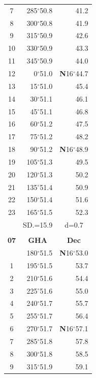 \documentclass[10pt, a4paper]{report}
\begin{document}
\begin{scriptsize}
\begin{tabular*}{0.2\textwidth}[t]{@{\extracolsep{\fill}}|c|rr|}
7 & 285$^\circ$50.8 & 41.2\\
8 & 300$^\circ$50.8 & 41.9\\
9 & 315$^\circ$50.9 & \raisebox{0.24ex}{\boldmath$\cdot$~\boldmath$\cdot$~~}42.6\\
10 & 330$^\circ$50.9 & 43.3\\
11 & 345$^\circ$50.9 & 44.0\\[2Pt]
12 & 0$^\circ$51.0 & \textbf{N}16$^\circ$44.7\\
13 & 15$^\circ$51.0 & 45.4\\
14 & 30$^\circ$51.1 & 46.1\\
15 & 45$^\circ$51.1 & \raisebox{0.24ex}{\boldmath$\cdot$~\boldmath$\cdot$~~}46.8\\
16 & 60$^\circ$51.2 & 47.5\\
17 & 75$^\circ$51.2 & 48.2\\[2Pt]
18 & 90$^\circ$51.2 & \textbf{N}16$^\circ$48.9\\
19 & 105$^\circ$51.3 & 49.5\\
20 & 120$^\circ$51.3 & 50.2\\
21 & 135$^\circ$51.4 & \raisebox{0.24ex}{\boldmath$\cdot$~\boldmath$\cdot$~~}50.9\\
22 & 150$^\circ$51.4 & 51.6\\
23 & 165$^\circ$51.5 & 52.3\\
\hline
\rule{0pt}{2.4ex} & \multicolumn{1}{c}{SD.=15.9} & \multicolumn{1}{c|}{d=0.7}\\
\hline
\multicolumn{1}{c}{}\\[-0.5ex]\hline
\multicolumn{1}{|c|}{\rule{0pt}{2.6ex}\textbf{07}} & \multicolumn{1}{c}{\textbf{GHA}} & \multicolumn{1}{c|}{\textbf{Dec}}\\
\hline\rule{0pt}{2.6ex}\noindent
0 & 180$^\circ$51.5 & \textbf{N}16$^\circ$53.0\\
1 & 195$^\circ$51.5 & 53.7\\
2 & 210$^\circ$51.6 & 54.4\\
3 & 225$^\circ$51.6 & \raisebox{0.24ex}{\boldmath$\cdot$~\boldmath$\cdot$~~}55.0\\
4 & 240$^\circ$51.7 & 55.7\\
5 & 255$^\circ$51.7 & 56.4\\[2Pt]
6 & 270$^\circ$51.7 & \textbf{N}16$^\circ$57.1\\
7 & 285$^\circ$51.8 & 57.8\\
8 & 300$^\circ$51.8 & 58.5\\
9 & 315$^\circ$51.9 & \raisebox{0.24ex}{\boldmath$\cdot$~\boldmath$\cdot$~~}59.1\\

\end{tabular*}
\end{scriptsize}
\end{document}
